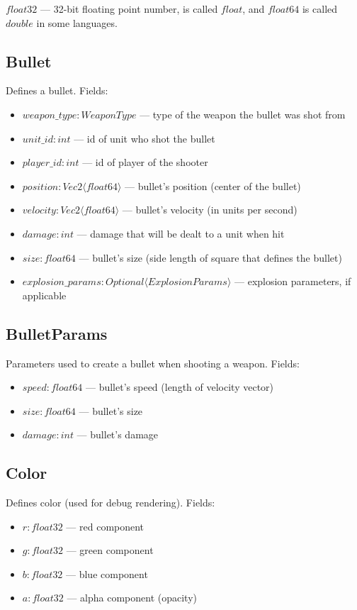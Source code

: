 $float32$ --- 32-bit floating point number, is called $float$, and $float64$ is called $double$ in some languages.

\subsection{Bullet}
Defines a bullet. Fields:
\begin{itemize}
    \item $weapon\_type : WeaponType$ --- type of the weapon the bullet was shot from
    \item $unit\_id : int$ --- id of unit who shot the bullet
    \item $player\_id : int$ --- id of player of the shooter
    \item $position : Vec2 \langle float64 \rangle$ --- bullet's position (center of the bullet)
    \item $velocity : Vec2 \langle float64 \rangle$ --- bullet's velocity (in units per second)
    \item $damage : int$ --- damage that will be dealt to a unit when hit
    \item $size : float64$ --- bullet's size (side length of square that defines the bullet)
    \item $explosion\_params : Optional \langle ExplosionParams \rangle$ --- explosion parameters, if applicable
\end{itemize}

\subsection{BulletParams}
Parameters used to create a bullet when shooting a weapon. Fields:
\begin{itemize}
    \item $speed : float64$ --- bullet's speed (length of velocity vector)
    \item $size : float64$ --- bullet's size
    \item $damage : int$ --- bullet's damage
\end{itemize}

\subsection{Color}
Defines color (used for debug rendering). Fields:
\begin{itemize}
    \item $r : float32$ --- red component
    \item $g : float32$ --- green component
    \item $b : float32$ --- blue component
    \item $a : float32$ --- alpha component (opacity)
\end{itemize}


